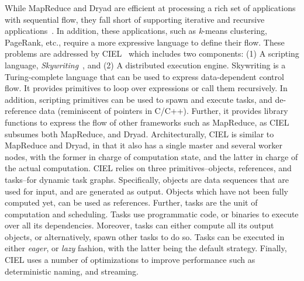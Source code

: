 \documentclass[a4paper,12pt,twoside,openright]{report}
\begin{document}
While MapReduce and Dryad are efficient at processing a rich set of applications
with sequential flow, they fall short of supporting iterative and recursive
applications~\cite{Bu:2010:HEI,Zaharia:2010:SCC}. In addition, these
applications, such as \emph{k}-means clustering, PageRank, etc., require a more
expressive language to define their flow. These problems are addressed by
CIEL~\cite{Murray:2011:CUE} which includes two components: (1) A scripting
language, \emph{Skywriting}~\cite{Murray:2010:SCS}, and (2) A distributed
execution engine. Skywriting is a Turing-complete language that can be used to
express data-dependent control flow. It provides primitives to loop over
expressions or call them recursively. In addition, scripting primitives can be
used to spawn and execute tasks, and de-reference data (reminiscent of pointers
in C/C++). Further, it provides library functions to express the flow of other
frameworks such as MapReduce, as CIEL subsumes both MapReduce, and Dryad.
Architecturally, CIEL is similar to MapReduce and Dryad, in that it also has a
single master and several worker nodes, with the former in charge of computation
state, and the latter in charge of the actual computation.
CIEL relies on three primitives--objects, references, and tasks--for dynamic
task graphs. Specifically, objects are data sequences that are used for input,
and are generated as output. Objects which have not been fully computed yet, can
be used as references. Further, tasks are the unit of computation and
scheduling. Tasks use programmatic code, or binaries to execute over all its
dependencies. Moreover, tasks can either compute all its output objects, or
alternatively, spawn other tasks to do so. Tasks can be executed in either
\emph{eager}, or \emph{lazy} fashion, with the latter being the default
strategy. Finally, CIEL uses a number of optimizations to improve performance
such as deterministic naming, and streaming.
\end{document}
